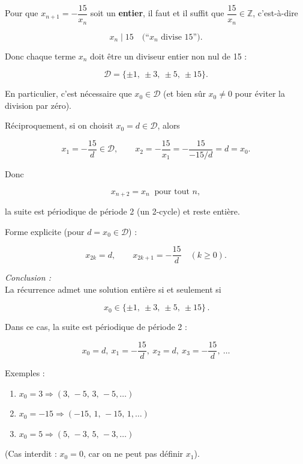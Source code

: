 \begin{solution}
    Pour que $x_{n+1}=-\dfrac{15}{x_n}$ soit un \textbf{entier}, il faut et il suffit que $\dfrac{15}{x_n}\in\mathbb{Z}$, c’est-à-dire

    $$
    x_n \mid 15 \quad\text{(“\(x_n\) divise 15”)}.
    $$
    
    Donc chaque terme $x_n$ doit être un diviseur entier non nul de 15 :
    
    $$
    \mathcal D=\{\pm1,\ \pm3,\ \pm5,\ \pm15\}.
    $$
    
    En particulier, c’est nécessaire que $x_0\in\mathcal D$ (et bien sûr $x_0\neq 0$ pour éviter la division par zéro).

    Réciproquement, si on choisit $x_0=d\in\mathcal D$, alors

    $$
    x_1=-\frac{15}{d}\in\mathcal D,\qquad
    x_2=-\frac{15}{x_1}=-\frac{15}{-15/d}=d=x_0.
    $$
    
    Donc
    
    $$
    \boxed{x_{n+2}=x_n\ \text{ pour tout }n,}
    $$
    
    la suite est périodique de période 2 (un 2-cycle) et reste entière.
    
    Forme explicite (pour $d=x_0\in\mathcal D$) :
    
    $$
    \boxed{\,x_{2k}=d,\qquad x_{2k+1}=-\dfrac{15}{d}\quad(k\ge0).\,}
    $$

    \textit{Conclusion :}\\
    La récurrence admet une solution entière si et seulement si

    $$
    \boxed{\,x_0\in\{\pm1,\ \pm3,\ \pm5,\ \pm15\}\, .}
    $$
    
    Dans ce cas, la suite est périodique de période 2 :
    
    $$
    x_0=d,\ x_1=-\frac{15}{d},\ x_2=d,\ x_3=-\frac{15}{d},\ \dots
    $$
    
    Exemples :
    \begin{enumerate}
        \item $x_0=3 \Rightarrow  (3,\,-5,\,3,\,-5,\dots)$
        \item $x_0=-15 \Rightarrow (-15,\,1,\,-15,\,1,\dots)$
        \item $x_0=5 \Rightarrow (5,\,-3,\,5,\,-3,\dots)$
    \end{enumerate} 

    (Cas interdit : $x_0=0$, car on ne peut pas définir $x_1$).
\end{solution}

